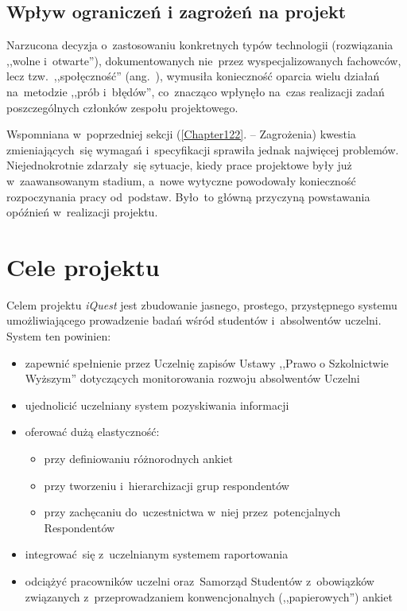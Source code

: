 \subsection{Wpływ ograniczeń i zagrożeń na projekt}
\label{Chapter123}

Narzucona decyzja o~zastosowaniu konkretnych typów technologii (rozwiązania ,,wolne i~otwarte''), dokumentowanych nie~przez wyspecjalizowanych fachowców, lecz tzw.~,,społęczność'' (ang.~), wymusiła konieczność oparcia wielu działań na~metodzie ,,prób i~błędów'', co~znacząco wpłynęło na~czas realizacji zadań poszczególnych członków zespołu projektowego.

Wspomniana w~poprzedniej sekcji (\ref{Chapter122}. -- Zagrożenia) kwestia zmieniających~się wymagań i~specyfikacji sprawiła jednak najwięcej problemów. Niejednokrotnie zdarzały~się sytuacje, kiedy prace projektowe były już w~zaawansowanym stadium, a~nowe wytyczne powodowały konieczność rozpoczynania pracy od~podstaw. Było~to główną przyczyną powstawania opóźnień w~realizacji projektu.

\section{Cele projektu}
\label{Chapter13}

Celem projektu \textit{iQuest} jest zbudowanie jasnego, prostego, przystępnego systemu umożliwiającego prowadzenie badań wśród studentów i~absolwentów uczelni. System ten powinien:
\begin{itemize}
\item{zapewnić spełnienie przez Uczelnię zapisów Ustawy ,,Prawo o Szkolnictwie Wyższym'' dotyczących monitorowania rozwoju absolwentów Uczelni\cite{AP:PoSW05}}
\item{ujednolicić uczelniany system pozyskiwania informacji}
\item{oferować dużą elastyczność:
\begin{itemize}
\item{przy definiowaniu różnorodnych ankiet}
\item{przy tworzeniu i~hierarchizacji grup respondentów}
\item{przy zachęcaniu do~uczestnictwa w~niej przez~potencjalnych Respondentów}
\end{itemize}}
\item{integrować~się z~uczelnianym systemem raportowania}
\item{odciążyć pracowników uczelni oraz~Samorząd Studentów z~obowiązków związanych z~przeprowadzaniem konwencjonalnych (,,papierowych'') ankiet}
\end{itemize}

